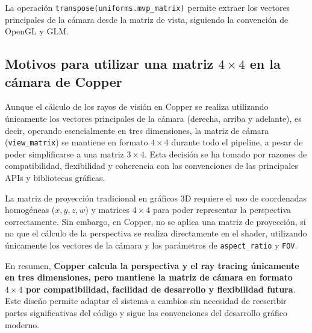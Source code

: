 La operación \texttt{transpose(uniforms.mvp\_matrix)} permite extraer los
vectores principales de la cámara desde la matriz de vista, siguiendo la
convención de OpenGL y GLM. \break

\subsection{Motivos para utilizar una matriz $4\times4$ en la cámara de Copper}

Aunque el cálculo de los rayos de visión en Copper se realiza utilizando
únicamente los vectores principales de la cámara (derecha, arriba y adelante),
es decir, operando esencialmente en tres dimensiones, la matriz de cámara
(\texttt{view\_matrix}) se mantiene en formato $4\times4$ durante todo el
pipeline, a pesar de poder simplificarse a una matriz $3\times4$. Esta decisión se ha tomado por razones de compatibilidad,
flexibilidad y coherencia con las convenciones de las principales APIs y
bibliotecas gráficas.

La matriz de proyección tradicional en gráficos 3D requiere el uso de coordenadas homogéneas ($x, y, z, w$) y
matrices $4\times4$ para poder representar la perspectiva correctamente\cite{Ahn2008}. Sin
embargo, en Copper, no se aplica una matriz de proyección, si no que el cálculo de la perspectiva se
realiza directamente en el shader, utilizando únicamente los vectores de la
cámara y los parámetros de \texttt{aspect\_ratio} y \texttt{FOV}.

En resumen, \textbf{Copper calcula la perspectiva y el ray tracing únicamente
    en tres dimensiones, pero mantiene la matriz de cámara en formato $4\times4$
    por compatibilidad, facilidad de desarrollo y flexibilidad futura}. Este diseño
permite adaptar el sistema a cambios sin necesidad de reescribir partes
significativas del código y sigue las convenciones del desarrollo gráfico
moderno.
